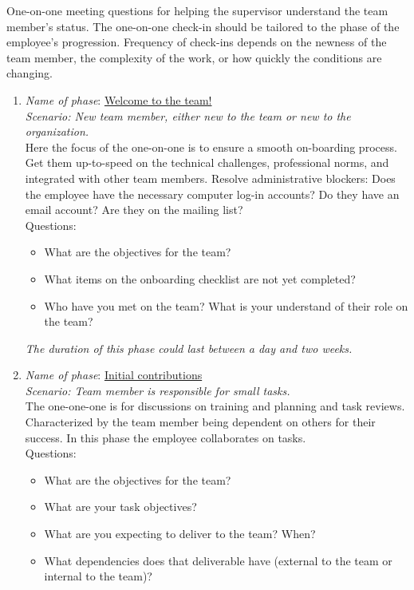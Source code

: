 One-on-one meeting questions for helping the supervisor understand the team member's status. 
The one-on-one check-in should be tailored to the phase of the employee's progression. Frequency of check-ins depends on the newness of the team member, the complexity of the work, or how quickly the conditions are changing.
\begin{enumerate}
    \item \textit{Name of phase}: \underline{Welcome to the team!}\\
    \textit{Scenario: New team member, either new to the team or new to the organization. }\\
    Here the focus of the one-on-one is to ensure a smooth on-boarding process. Get them up-to-speed on the technical challenges, professional norms, and integrated with other team members. Resolve administrative blockers: Does the employee have the necessary computer log-in accounts? Do they have an email account? Are they on the mailing list? \\
    Questions:
    \begin{itemize}
        \item What are the objectives for the team?
        \item What items on the onboarding checklist are not yet completed?
        \item Who have you met on the team? What is your understand of their role on the team?
    \end{itemize}
\textit{The duration of this phase could last between a day and two weeks.}
    \item \textit{Name of phase}: \underline{Initial contributions}\\
    \textit{Scenario: Team member is responsible for small tasks. }\\
    The one-one-one is for discussions on training and planning and task reviews. Characterized by the team member being dependent on others for their success. In this phase the employee collaborates on tasks.\\
    Questions:
    \begin{itemize}
        \item What are the objectives for the team?
        \item What are your task objectives?
        \item What are you expecting to deliver to the team? When? 
        \item What dependencies does that deliverable have (external to the team or internal to the team)?

\end{itemize}
\end{enumerate}
